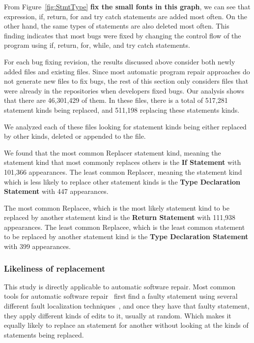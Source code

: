 \documentclass{sig-alternate-05-2015}
\newcommand{\todo}[1]
  {{\scriptsize \textbf{\color{red} {#1}}}}
\begin{document}
From Figure~\ref{fig:StmtType} \todo{fix the small fonts in this graph}, we can
see that expression, if, return, for and try catch statements are added most
often. On the other hand, the same types of statements are also deleted most
often. This finding indicates that most bugs were fixed by changing the control
flow of the program using if, return, for, while, and try catch statements. 

For each bug fixing revision, the results discussed above consider both newly
added files and existing files. Since most automatic program repair approaches
do not generate new files to fix bugs, the rest of this section only considers
files that were already in the repositories when developers fixed bugs. Our
analysis shows that there are 46,301,429 of them. In these files, there is a
total of 517,281 statement kinds being replaced, and 511,198 replacing these
statements kinds.

We analyzed each of these files looking for statement kinds being either replaced by other kinds, deleted or appended to the file.

We found that the most common Replacer statement kind, meaning the statement
kind that most commonly replaces others is the \textbf{If Statement} with
101,366 appearances. The least common Replacer, meaning the statement kind which
is less likely to replace other statement kinds is the \textbf{Type Declaration
  Statement} with 447 appearances.

The most common Replacee, which is the most likely statement kind to be replaced
by another statement kind is the \textbf{Return Statement} with 111,938
appearances. The least common Replacee, which is the least common statement to
be replaced by another statement kind is the \textbf{Type Declaration Statement}
with 399 appearances.

\subsubsection{Likeliness of replacement}
This study is directly applicable to automatic software repair. Most common
tools for automatic software repair~\cite{kim2013,weimer2009,legoues2012}
first find a faulty statement using several different fault localization
techniques~\cite{fry2010}, and once they have that faulty statement, they apply
different kinds of edits to it, usually at random. Which makes it equally likely
to replace an statement for another without looking at the kinds of statements
being replaced.
\end{document}

